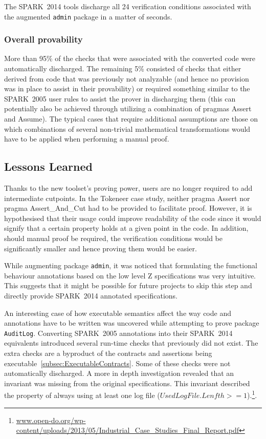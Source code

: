 \documentclass[10pt,a4paper,twocolumn]{article}
\newcommand{\oldspark}{SPARK~2005\xspace}
\newcommand{\newspark}{SPARK~2014\xspace}
\newcommand{\SPARK}[1]{\lstinline[language=Ada,basicstyle={\footnotesize
      \sffamily},framesep=0pt]$#1$}
\begin{document}
The \newspark tools discharge all 24 verification conditions
associated with the augmented \SPARK{admin} package in a matter of
seconds.

\subsubsection{Overall provability}

More than 95\% of the checks that were associated with the converted
code were automatically discharged. The remaining 5\% consisted of
checks that either derived from code that was previously not
analyzable (and hence no provision was in place to assist in their
provability) or required something similar to the \oldspark user rules
to assist the prover in discharging them (this can potentially also be
achieved through utilizing a combination of pragmas Assert and
Assume). The typical cases that require additional assumptions are
those on which combinations of several non-trivial mathematical
transformations would have to be applied when performing a manual
proof.

\subsection{Lessons Learned}

Thanks to the new toolset's proving power, users are no longer
required to add intermediate cutpoints. In the Tokeneer case study,
neither pragma Assert nor pragma Assert\_And\_Cut had to be provided
to facilitate proof. However, it is hypothesised that their usage
could improve readability of the code since it would signify that a
certain property holds at a given point in the code. In addition,
should manual proof be required, the verification conditions would be
significantly smaller and hence proving them would be easier.

While augmenting package \SPARK{admin}, it was noticed that formulating
the functional behaviour annotations based on the low level Z
specifications was very intuitive. This suggests that it might be
possible for future projects to skip this step and directly provide
\newspark annotated specifications.

An interesting case of how executable semantics affect the way code
and annotations have to be written was uncovered while attempting to
prove package \SPARK{AuditLog}. Converting \oldspark annotations into
their \newspark equivalents introduced several run-time checks that
previously did not exist. The extra checks are a byproduct of the
contracts and assertions being
executable~\ref{subsec:ExecutableContracts}. Some of these checks were
not automatically discharged. A more in depth investigation revealed
that an invariant was missing from the original specifications. This
invariant described the property of always using at least one log file
($UsedLogFile.Lenfth >= 1$).\footnote{\url{www.open-do.org/wp-content/uploads/2013/05/Industrial_Case_Studies_Final_Report.pdf}}.
\end{document}
